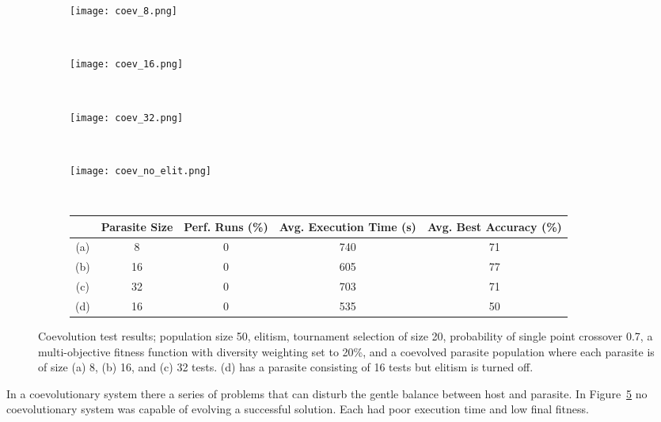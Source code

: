 \begin{figure}
	\centering
	\begin{subfigure}[ht]{0.49\textwidth}
		\texttt{[image: coev\_8.png]}
		\caption{}
		\vspace{1em}
		\label{fig:coev_8}
	\end{subfigure}
	~
	\begin{subfigure}[ht]{0.49\textwidth}
		\texttt{[image: coev\_16.png]}
		\caption{}
		\label{fig:coev_16}
		\vspace{1em}
	\end{subfigure}
	~
	\begin{subfigure}[ht]{0.49\textwidth}
		\texttt{[image: coev\_32.png]}
		\caption{}
		\label{fig:coev_32}
		\vspace{1em}
	\end{subfigure}
	~
	\begin{subfigure}[ht]{0.49\textwidth}
		\texttt{[image: coev\_no\_elit.png]}
		\caption{}
		\label{fig:coev_16_no_elit}
		\vspace{1em}
	\end{subfigure}
	~
	\begin{subfigure}[ht]{\textwidth}
		\centering
		\begin{tabular}{ccccc}
			\toprule
			& \bfseries{Parasite Size} &
			\bfseries{Perf. Runs (\%)} &
			\bfseries{Avg. Execution Time (s)} & \bfseries{Avg. Best Accuracy (\%)}\\
			\midrule
			(a) & 8 & 0 & 740 & 71 \\
			(b) & 16 & 0 & 605 & 77 \\
			(c) & 32 & 0 & 703 & 71 \\
			(d) & 16 & 0 & 535 & 50 \\
			\bottomrule
		\end{tabular}
	\end{subfigure}

	\caption[Coevolution test results]{Coevolution test results;
	population size 50, elitism, tournament selection of size 20, probability
	of single point crossover 0.7, a multi-objective fitness function with
	diversity weighting set to 20\%, and a coevolved parasite population where
	each parasite is of size
	(a) 8, (b) 16, and (c) 32 tests. (d) has a parasite consisting of 16 tests
	but elitism is turned off.}
	\label{fig:coev}
\end{figure}

In a coevolutionary system there a series of problems that can disturb the gentle
balance between host and parasite.
In Figure~\ref{fig:coev} no coevolutionary system was capable of evolving a successful
solution. Each had poor execution time and low final fitness.


